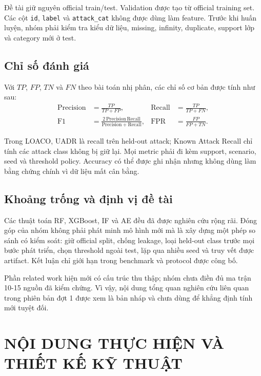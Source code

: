 \documentclass[12pt,a4paper,oneside]{report}
\begin{document}
Đề tài giữ nguyên official train/test. Validation được tạo từ official training set. Các cột \texttt{id}, \texttt{label} và \texttt{attack\_cat} không được dùng làm feature. Trước khi huấn luyện, nhóm phải kiểm tra kiểu dữ liệu, missing, infinity, duplicate, support lớp và category mới ở test.

\section{Chỉ số đánh giá}

Với $TP$, $FP$, $TN$ và $FN$ theo bài toán nhị phân, các chỉ số cơ bản được tính như sau:
\begin{align}
\mathrm{Precision} &= \frac{TP}{TP+FP}, &
\mathrm{Recall} &= \frac{TP}{TP+FN},\\
\mathrm{F1} &= \frac{2\,\mathrm{Precision}\,\mathrm{Recall}}
{\mathrm{Precision}+\mathrm{Recall}}, &
\mathrm{FPR} &= \frac{FP}{FP+TN}.
\end{align}

Trong LOACO, UADR là recall trên held-out attack; Known Attack Recall chỉ tính các attack class không bị giữ lại. Mọi metric phải đi kèm support, scenario, seed và threshold policy. Accuracy có thể được ghi nhận nhưng không dùng làm bằng chứng chính vì dữ liệu mất cân bằng.

\section{Khoảng trống và định vị đề tài}

Các thuật toán RF, XGBoost, IF và AE đều đã được nghiên cứu rộng rãi. Đóng góp của nhóm không phải phát minh mô hình mới mà là xây dựng một phép so sánh có kiểm soát: giữ official split, chống leakage, loại held-out class trước mọi bước phát triển, chọn threshold ngoài test, lặp qua nhiều seed và truy vết được artifact. Kết luận chỉ giới hạn trong benchmark và protocol được công bố.

Phần related work hiện mới có cấu trúc thu thập; nhóm chưa điền đủ ma trận 10-15 nguồn đã kiểm chứng. Vì vậy, nội dung tổng quan nghiên cứu liên quan trong phiên bản đợt 1 được xem là bản nháp và chưa dùng để khẳng định tính mới tuyệt đối.

\chapter{NỘI DUNG THỰC HIỆN VÀ THIẾT KẾ KỸ THUẬT}
\end{document}
